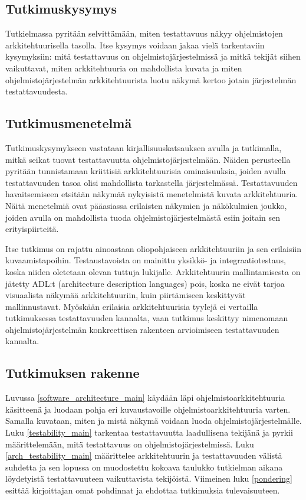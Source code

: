 \documentclass[finnish]{tktltiki2}
\numberwithin{table}{section}
\theoremstyle{definition}
\theoremstyle{remark}
\begin{document}
\subsection{Tutkimuskysymys}
Tutkielmassa pyritään selvittämään, miten testattavuus näkyy ohjelmistojen arkkitehtuurisella tasolla. Itse kysymys voidaan jakaa vielä tarkentaviin kysymyksiin: mitä testattavuus on ohjelmistojärjestelmissä ja mitkä tekijät siihen vaikuttavat, miten arkkitehtuuria on mahdollista kuvata ja miten ohjelmistojärjestelmän arkkitehtuurista luotu näkymä kertoo jotain järjestelmän testattavuudesta. 

\subsection{Tutkimusmenetelmä}
Tutkimuskysymykseen vastataan kirjallisuuskatsauksen avulla ja tutkimalla, mitkä seikat tuovat testattavuutta ohjelmistojärjestelmään. Näiden perusteella pyritään tunnistamaan kriittisiä arkkitehtuurisia ominaisuuksia, joiden avulla testattavuuden tasoa olisi mahdollista tarkastella järjestelmässä. Testattavuuden havaitsemiseen etsitään näkymää nykyisistä menetelmistä kuvata arkkitehtuuria. Näitä menetelmiä ovat pääasiassa erilaisten näkymien ja näkökulmien joukko, joiden avulla on mahdollista tuoda ohjelmistojärjestelmästä esiin joitain sen erityispiirteitä.

Itse tutkimus on rajattu ainoastaan oliopohjaiseen arkkitehtuuriin ja sen erilaisiin kuvaamistapoihin. Testaustavoista on mainittu yksikkö- ja integraatiotestaus, koska niiden oletetaan olevan tuttuja lukijalle. Arkkitehtuurin mallintamisesta on jätetty ADL:t (architecture description languages) pois, koska ne eivät tarjoa visuaalista näkymää arkkitehtuuriin, kuin piirtämiseen keskittyvät mallinnustavat. Myöskään erilaisia arkkitehtuurisia tyylejä ei vertailla tutkimuksessa testattavuuden kannalta, vaan tutkimus keskittyy nimenomaan ohjelmistojärjestelmän konkreettisen rakenteen arvioimiseen testattavuuden kannalta.

\subsection{Tutkimuksen rakenne}

Luvussa \ref{software_architecture_main} käydään läpi ohjelmistoarkkitehtuuria käsitteenä ja luodaan pohja eri kuvaustavoille ohjelmistoarkkitehtuuria varten. Samalla kuvataan, miten ja mistä näkymä voidaan luoda ohjelmistojärjestelmälle. Luku \ref{testability_main} tarkentaa testattavuutta laadullisena tekijänä ja pyrkii määrittelemään, mitä testattavuus on ohjelmistojärjestelmissä. Luku \ref{arch_testability_main} määrittelee arkkitehtuurin ja testattavuuden välistä suhdetta ja sen lopussa on muodostettu kokoava taulukko tutkielman aikana löydetyistä testattavuuteen vaikuttavista tekijöistä. Viimeinen luku \ref{pondering} esittää kirjoittajan omat pohdinnat ja ehdottaa tutkimuksia tulevaisuuteen. 
\end{document}
